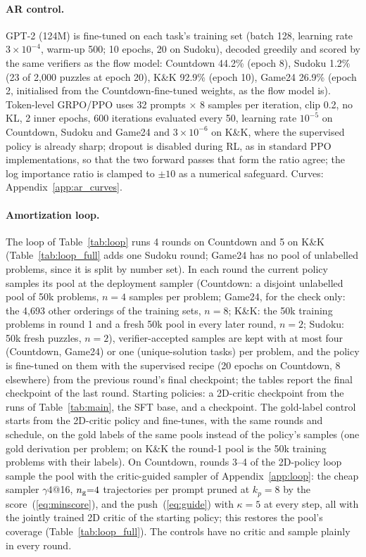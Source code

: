 \paragraph{AR control.}
GPT-2 (124M) \citep{radford2019gpt2} is fine-tuned on each task's training set (batch 128, learning rate $3\times10^{-4}$, warm-up 500; 10 epochs, 20 on Sudoku), decoded greedily and scored by the same verifiers as the flow model: Countdown 44.2\% (epoch 8), Sudoku 1.2\% (23 of 2{,}000 puzzles at epoch 20), K\&K 92.9\% (epoch 10), Game24 26.9\% (epoch 2, initialised from the Countdown-fine-tuned weights, as the flow model is). Token-level GRPO/PPO uses 32 prompts $\times$ 8 samples per iteration, clip 0.2, no KL, 2 inner epochs, 600 iterations evaluated every 50, learning rate $10^{-5}$ on Countdown, Sudoku and Game24 and $3\times10^{-6}$ on K\&K, where the supervised policy is already sharp; dropout is disabled during RL, as in standard PPO implementations, so that the two forward passes that form the ratio agree; the log importance ratio is clamped to $\pm10$ as a numerical safeguard. Curves: Appendix~\ref{app:ar_curves}.

\paragraph{Amortization loop.}
The loop of Table~\ref{tab:loop} runs 4 rounds on Countdown and 5 on K\&K (Table~\ref{tab:loop_full} adds one Sudoku round; Game24 has no pool of unlabelled problems, since it is split by number set). In each round the current policy samples its pool at the deployment sampler (Countdown: a disjoint unlabelled pool of 50k problems, $n{=}4$ samples per problem; Game24, for the check only: the 4{,}693 other orderings of the training sets, $n{=}8$; K\&K: the 50k training problems in round 1 and a fresh 50k pool in every later round, $n{=}2$; Sudoku: 50k fresh puzzles, $n{=}2$), verifier-accepted samples are kept with at most four (Countdown, Game24) or one (unique-solution tasks) per problem, and the policy is fine-tuned on them with the supervised recipe (20 epochs on Countdown, 8 elsewhere) from the previous round's final checkpoint; the tables report the final checkpoint of the last round. Starting policies: a 2D-critic checkpoint from the runs of Table~\ref{tab:main}, the SFT base, and a \methodGRPO{} checkpoint. The gold-label control starts from the 2D-critic policy and fine-tunes, with the same rounds and schedule, on the gold labels of the same pools instead of the policy's samples (one gold derivation per problem; on K\&K the round-1 pool is the 50k training problems with their labels). On Countdown, rounds 3--4 of the 2D-policy loop sample the pool with the critic-guided sampler of Appendix~\ref{app:loop}: the cheap sampler $\gamma4$@16, $n_{\rm g}{=}4$ trajectories per prompt pruned at $k_p{=}8$ by the score~(\ref{eq:minscore}), and the push~(\ref{eq:guide}) with $\kappa{=}5$ at every step, all with the jointly trained 2D critic of the starting policy; this restores the pool's coverage (Table~\ref{tab:loop_full}). The controls have no critic and sample plainly in every round.

